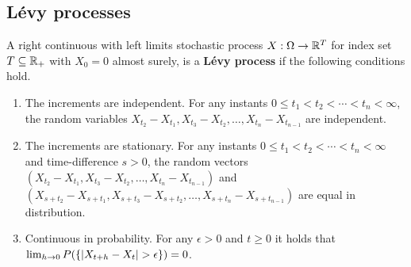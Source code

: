 \documentclass[letterpaper,10pt,english]{article}
\begin{document}
\subsection{L\'evy processes}
A right continuous with left limits stochastic process $X:\Omega\to\mathbb{R}^T$ for index set $T \subseteq \mathbb{R}_+$ with $X_0 = 0$ almost surely, is a \textbf{L\'evy process} if the following conditions hold. 
\begin{enumerate}[(L1)]
\item The increments are independent. 
For any instants $ 0\le t_{1}<t_{2}<\cdots <t_{n}<\infty$, the random variables $X_{t_{2}}-X_{t_{1}},X_{t_{3}}-X_{t_{2}},\dots ,X_{t_{n}}-X_{t_{n-1}}$ are independent.
\item The increments are stationary. 
For any instants $0\le t_{1}<t_{2}<\cdots <t_{n}<\infty$ and time-difference $s > 0$, 
the random vectors $(X_{t_{2}}-X_{t_{1}},X_{t_{3}}-X_{t_{2}},\dots ,X_{t_{n}}-X_{t_{n-1}})$ and $(X_{s+t_{2}}-X_{s+t_{1}},X_{s+t_{3}}-X_{s+t_{2}},\dots ,X_{s+t_{n}}-X_{s+t_{n-1}})$ are equal in distribution. 
\item Continuous in probability. For any $\epsilon > 0$ and $t\ge 0$ it holds that $\lim _{h\to 0}P(\left\{\left\lvert X_{t+h}-X_{t}\right\rvert>\epsilon\right\})=0$. 
\end{enumerate}
\end{document}
